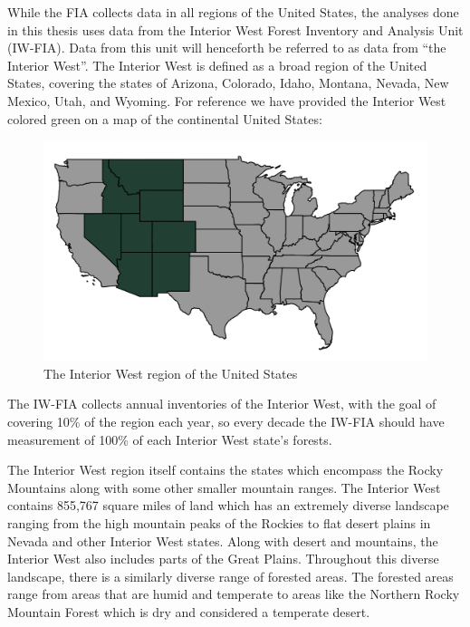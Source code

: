 \documentclass[12pt,twoside]{reedthesis}
\begin{document}
While the FIA collects data in all regions of the United States, the analyses done in this thesis uses data from the Interior West Forest Inventory and Analysis Unit (IW-FIA). Data from this unit will henceforth be referred to as data from ``the Interior West''. The Interior West is defined as a broad region of the United States, covering the states of Arizona, Colorado, Idaho, Montana, Nevada, New Mexico, Utah, and Wyoming. For reference we have provided the Interior West colored green on a map of the continental United States:
\begin{figure}

{\centering \includegraphics[width=1\linewidth]{figure/interior-west-on-usa} 

}

\caption{The Interior West region of the United States}\label{fig:unnamed-chunk-3}
\end{figure}
The IW-FIA collects annual inventories of the Interior West, with the goal of covering 10\% of the region each year, so every decade the IW-FIA should have measurement of 100\% of each Interior West state's forests.

The Interior West region itself contains the states which encompass the Rocky Mountains along with some other smaller mountain ranges. The Interior West contains 855,767 square miles of land which has an extremely diverse landscape ranging from the high mountain peaks of the Rockies to flat desert plains in Nevada and other Interior West states. Along with desert and mountains, the Interior West also includes parts of the Great Plains. Throughout this diverse landscape, there is a similarly diverse range of forested areas. The forested areas range from areas that are humid and temperate to areas like the Northern Rocky Mountain Forest which is dry and considered a temperate desert.
\end{document}
